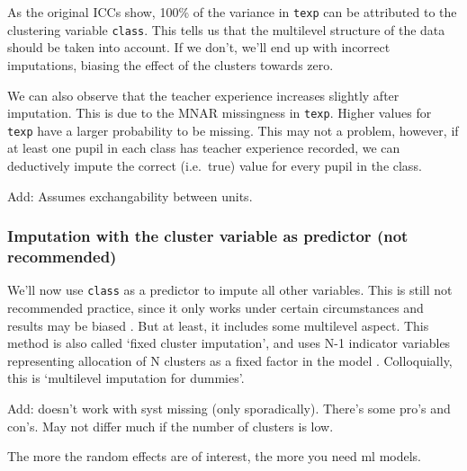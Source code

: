 \documentclass[
]{jss}
\begin{document}
As the original ICCs show, 100\% of the variance in \texttt{texp} can be
attributed to the clustering variable \texttt{class}. This tells us that
the multilevel structure of the data should be taken into account. If we
don't, we'll end up with incorrect imputations, biasing the effect of
the clusters towards zero.

We can also observe that the teacher experience increases slightly after
imputation. This is due to the MNAR missingness in \texttt{texp}. Higher
values for \texttt{texp} have a larger probability to be missing. This
may not a problem, however, if at least one pupil in each class has
teacher experience recorded, we can deductively impute the correct
(i.e.~true) value for every pupil in the class.

Add: Assumes exchangability between units.

\hypertarget{imputation-with-the-cluster-variable-as-predictor-not-recommended}{%
\subsubsection{Imputation with the cluster variable as predictor (not
recommended)}\label{imputation-with-the-cluster-variable-as-predictor-not-recommended}}

We'll now use \texttt{class} as a predictor to impute all other
variables. This is still not recommended practice, since it only works
under certain circumstances and results may be biased
\citep{drec15, ende16}. But at least, it includes some multilevel
aspect. This method is also called `fixed cluster imputation', and uses
N-1 indicator variables representing allocation of N clusters as a fixed
factor in the model \citep{reit06, ende2016}. Colloquially, this is
`multilevel imputation for dummies'.

Add: doesn't work with syst missing (only sporadically). There's some
pro's and con's. May not differ much if the number of clusters is low.

The more the random effects are of interest, the more you need ml
models.

\begin{CodeChunk}
\end{CodeChunk}
\end{document}

